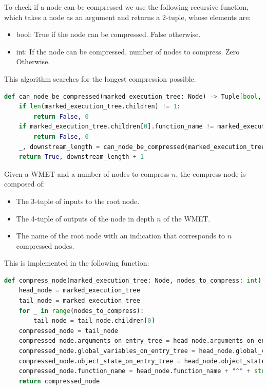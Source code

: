 To check if a node can be compressed we use the following recursive function, which takes a node as an argument and returns a 2-tuple, whose elements are:
\begin{itemize}
    \item bool: True if the node can be compressed. False otherwise.
    \item int: If the node can be compressed, number of nodes to compress. Zero Otherwise.
\end{itemize}
This algorithm searches for the longest compression possible.
\begin{lstlisting}[language=Python, caption=Checking if node can be compressed]
def can_node_be_compressed(marked_execution_tree: Node) -> Tuple[bool, int]:
    if len(marked_execution_tree.children) != 1:
        return False, 0
    if marked_execution_tree.children[0].function_name != marked_execution_tree.function_name:
        return False, 0
    _, downstream_length = can_node_be_compressed(marked_execution_tree.children[0])
    return True, downstream_length + 1
\end{lstlisting}

Given a WMET and a number of nodes to compress \(n\), the compress node is composed of:
\begin{itemize}
    \item The 3-tuple of inputs to the root node.
    \item The 4-tuple of outputs of the node in depth \(n\) of the WMET.
    \item The name of the root node with an indication that corresponds to \(n\) compressed nodes.
\end{itemize}
This is implemented in the following function:
\begin{lstlisting}[language=Python, caption=Compression node]
def compress_node(marked_execution_tree: Node, nodes_to_compress: int) -> Node:
    head_node = marked_execution_tree
    tail_node = marked_execution_tree
    for _ in range(nodes_to_compress):
        tail_node = tail_node.children[0]
    compressed_node = tail_node
    compressed_node.arguments_on_entry_tree = head_node.arguments_on_entry_tree
    compressed_node.global_variables_on_entry_tree = head_node.global_variables_on_entry_tree
    compressed_node.object_state_on_entry_tree = head_node.object_state_on_entry_tree
    compressed_node.function_name = head_node.function_name + "^" + str(nodes_to_compress + 1)
    return compressed_node
\end{lstlisting}


